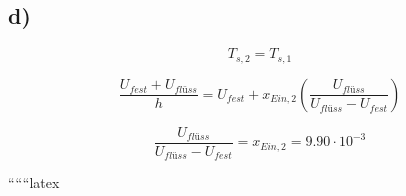 \subsection*{d)}
\begin{equation*}
T_{s,2} = T_{s,1}
\end{equation*}

\begin{equation*}
\frac{U_{fest} + U_{flüss}}{h} = U_{fest} + x_{Ein,2} \left( \frac{U_{flüss}}{U_{flüss} - U_{fest}} \right)
\end{equation*}

\begin{equation*}
\frac{U_{flüss}}{U_{flüss} - U_{fest}} = x_{Ein,2} = 9.90 \cdot 10^{-3}
\end{equation*}

``````latex


